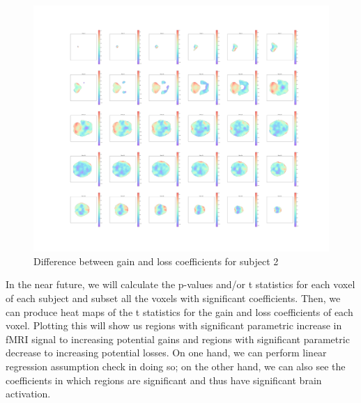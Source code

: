 \begin{figure}[H]
    \centering
        \includegraphics[scale=0.5]{figures/sub2diff_heatmap.png}
    \caption{Difference between gain and loss coefficients for subject 2}
\end{figure}

In the near future, we will calculate the p-values and/or t statistics for 
each voxel of each subject and subset all the voxels with significant 
coefficients. Then, we can produce heat maps of the t statistics for the gain 
and loss coefficients of each voxel. Plotting this will show us regions with 
significant parametric increase in fMRI signal to increasing potential gains 
and regions with significant parametric decrease to increasing potential 
losses. On one hand, we can perform linear regression assumption check in 
doing so; on the other hand, we can also see the coefficients in which regions 
are significant and thus have significant brain activation.


